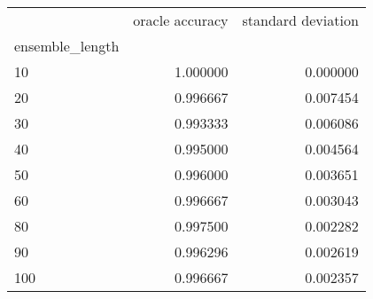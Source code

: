 \begin{tabular}{lrr}
\toprule
{} &  oracle accuracy &  standard deviation \\
ensemble\_length &                  &                     \\
\midrule
10              &         1.000000 &            0.000000 \\
20              &         0.996667 &            0.007454 \\
30              &         0.993333 &            0.006086 \\
40              &         0.995000 &            0.004564 \\
50              &         0.996000 &            0.003651 \\
60              &         0.996667 &            0.003043 \\
80              &         0.997500 &            0.002282 \\
90              &         0.996296 &            0.002619 \\
100             &         0.996667 &            0.002357 \\
\bottomrule
\end{tabular}
